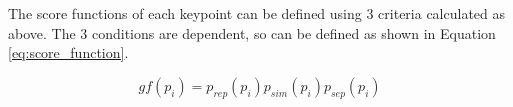 
The score functions of each keypoint can be defined using 3 criteria calculated as above. The 3 conditions are dependent, so can be defined as shown in Equation \eqref{eq:score_function}. 

\begin{equation}\label{eq:score_function}
gf(p_i) = p_{rep}(p_i)p_{sim}(p_i)p_{sep}(p_i)
\end{equation} 




